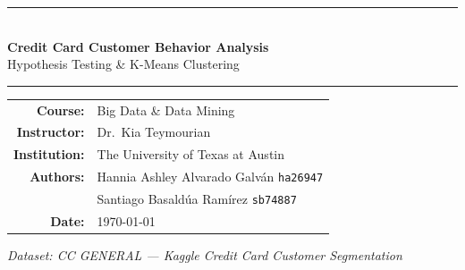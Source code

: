 \documentclass[12pt, letterpaper]{article}
\begin{document}
\begin{titlepage}
  \centering
  \vspace*{2cm}
  {\color{burnt}\rule{\linewidth}{2pt}}\\[0.5cm]
  {\LARGE\bfseries Credit Card Customer Behavior Analysis}\\[0.3cm]
  {\large Hypothesis Testing \& K-Means Clustering}\\[0.3cm]
  {\color{burnt}\rule{\linewidth}{2pt}}
  \vspace{1.5cm}
  {\large
    \begin{tabular}{rl}
      \textbf{Course:}      & Big Data \& Data Mining \\[0.3em]
      \textbf{Instructor:}  & Dr.\ Kia Teymourian \\[0.3em]
      \textbf{Institution:} & The University of Texas at Austin \\[0.3em]
      \textbf{Authors:}     & Hannia Ashley Alvarado Galv\'{a}n \quad \texttt{ha26947} \\
                            & Santiago Basald\'{u}a Ram\'{i}rez \quad \texttt{sb74887} \\[0.3em]
      \textbf{Date:}        & \today \\
    \end{tabular}
  }
  \vspace{1.5cm}
  \begin{abstract}
    \noindent
    This report documents the methodology, analysis, and results of a data analytics
    project using a real-world credit card dataset containing 8{,}950 customer records
    across 18 behavioral and financial variables. The project has two parts.
    \textbf{Part 1} applies formal hypothesis testing to evaluate two claims:
    (1) that customers who frequently use cash advances carry significantly higher
    account balances (Welch's two-sample $t$-test), and (2) that account balance
    is a strong predictor of credit limit (Pearson correlation --- debunked).
    \textbf{Part 2} applies K-Means clustering to discover five distinct and
    interpretable customer behavioral profiles. All analysis was performed in R
    using \texttt{dplyr} for data wrangling and base R statistical functions.
  \end{abstract}
  \vfill
  {\small\textit{Dataset: CC GENERAL --- Kaggle Credit Card Customer Segmentation}}
\end{titlepage}

\tableofcontents
\newpage
\onehalfspacing

\end{document}
